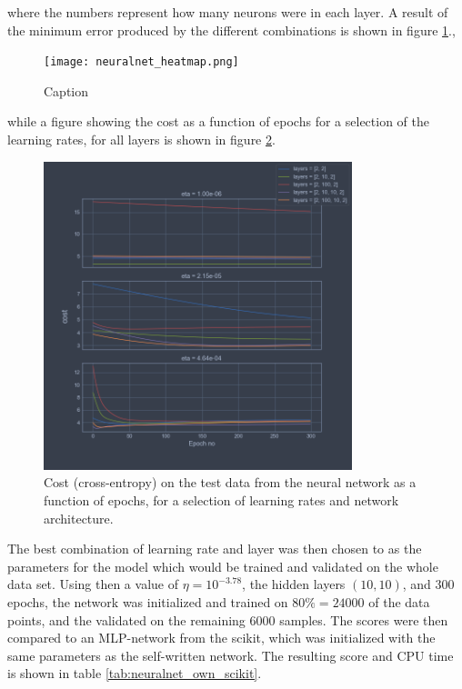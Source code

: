 \documentclass[a4paper,10pt,english]{article}
\begin{document}
where the numbers represent how many neurons were in each layer. A result of the minimum error produced by the different combinations is shown in figure \ref{fig:neuralnet_heatmap}., 

\begin{figure}
    \centering
    \texttt{[image: neuralnet\_heatmap.png]}
    \caption{Caption}
    \label{fig:neuralnet_heatmap}
\end{figure}

while a figure showing the cost as a function of epochs for a selection of the learning rates, for all layers is shown in figure \ref{fig:neuralnet_cost}.

\begin{figure}
    \centering
    \includegraphics[width=0.8\textwidth]{neuralnet_cost.png}
    \caption{Cost (cross-entropy) on the test data from the neural network as a function of epochs, for a selection of learning rates and network architecture.}
    \label{fig:neuralnet_cost}
\end{figure}

The best combination of learning rate and layer was then chosen to as the parameters for the model which would be trained and validated on the whole data set. Using then a value of $\eta = 10^{-3.78}$, the hidden layers $(10, 10)$, and 300 epochs, the network was initialized and trained on $80\% = 24000$ of the data points, and the validated on the remaining $6000$ samples. The scores were then compared to an MLP-network from the scikit, which was initialized with the same parameters as the self-written network. The resulting score and CPU time is shown in table \ref{tab:neuralnet_own_scikit}.
\end{document}
